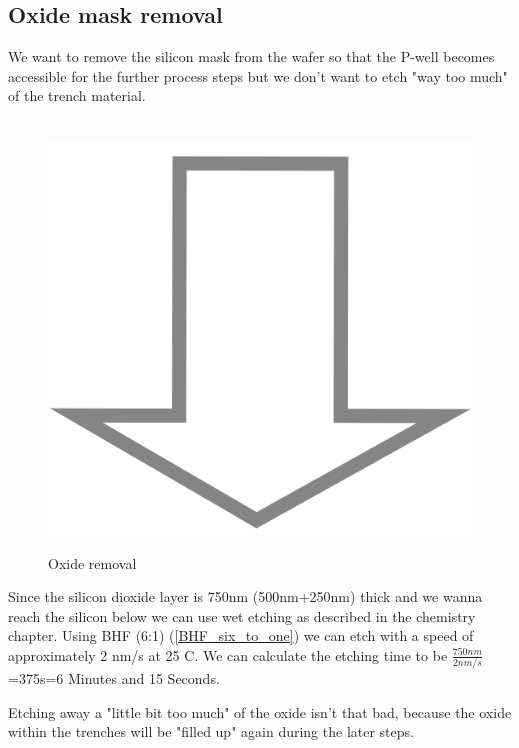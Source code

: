 \subsection{Oxide mask removal}
We want to remove the silicon mask from the wafer so that the P-well becomes accessible for the further process steps but we don't want to etch "way too much" of the trench material.
\begin{figure}[H]
	\centering
	\begin{tikzpicture}[node distance = 3cm, auto, thick,scale=\CrossSectionOnly, every node/.style={transform shape}]
		
	\end{tikzpicture} \\
	\includegraphics[scale=0.01]{down_arrow.png} \\
	\begin{tikzpicture}[node distance = 3cm, auto, thick,scale=\CrossSectionOnly, every node/.style={transform shape}]
		
	\end{tikzpicture}
	\caption{Oxide removal}
\end{figure}
Since the silicon dioxide layer is 750nm (500nm+250nm) thick and we wanna reach the silicon below we can use wet etching as described in the chemistry chapter.
Using BHF (6:1) (\autoref{BHF_six_to_one}) we can etch with a speed of approximately 2 nm/s at 25 \degree C.
We can calculate the etching time to be $\frac{750nm}{2nm/s}$=375s=6 Minutes and 15 Seconds.

Etching away a "little bit too much" of the oxide isn't that bad, because the oxide within the trenches will be "filled up" again during the later steps.
